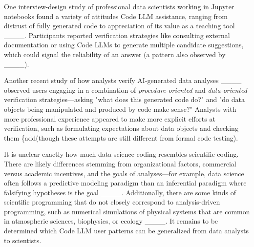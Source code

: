  One interview-design study of professional data scientists working in Jupyter notebooks found a variety of attitudes  Code LLM assistance, ranging from distrust of fully generated code to appreciation of its value as a teaching tool ____. Participants reported verification strategies like consulting external documentation or using  Code LLMs to generate multiple candidate suggestions, which could signal the reliability of an answer (a pattern also observed by ____). 

Another recent study of how analysts verify AI-generated data analyses ____ observed users engaging in a combination of \textit{procedure-oriented} and \textit{data-oriented} verification strategies---asking "what does this generated code do?" and "do data objects being manipulated and produced by code make sense?" Analysts with more professional experience appeared to make more explicit efforts at verification, such as formulating expectations about data objects and checking them \{add{(though these attempts are still different from formal code testing)}. 

It is unclear exactly how much data science coding resembles scientific coding. There are likely  differences stemming from organizational factors, commercial versus academic incentives, and the goals of analyses---for example, data science often follows a predictive modeling paradigm than an inferential paradigm where falsifying hypotheses is the goal ____. Additionally, there are some kinds of scientific programming that do not closely correspond to analysis-driven programming, such as numerical simulations of physical systems that are common in atmospheric sciences, biophysics, or ecology ____. It remains to be determined which Code LLM user patterns can be generalized from data analysts to scientists.


